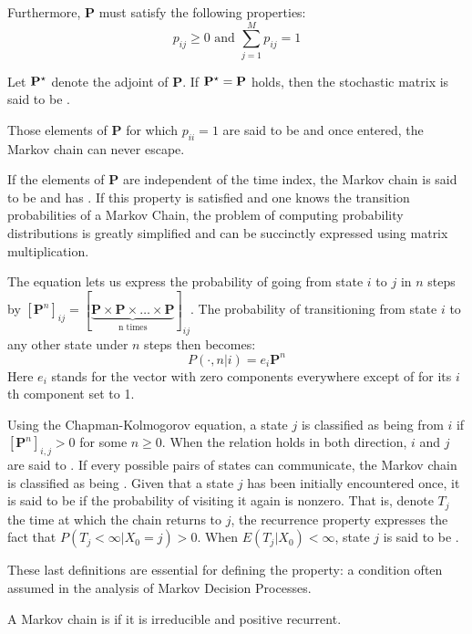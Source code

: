 Furthermore, $\mathbf{P} $ must satisfy the following properties:
\begin{equation}
p_{ij} \geq 0 \mbox{ and } \sum_{j=1}^M p_{ij} =1 
\end{equation}

Let $\mathbf{P}^\star$ denote the adjoint of $\mathbf{P}$. If $\mathbf{P}^\star = \mathbf{P}$ holds, then the stochastic matrix is said to be . 

Those elements of $\mathbf{P}$ for which $p_{ii} = 1$ are said to be
 and once entered, the Markov chain can never escape.

If the elements of $\mathbf{P} $ are independent of the time index, the
Markov chain is said to be  and has . If this property is satisfied and one knows the transition probabilities of
a Markov Chain, the problem of computing probability distributions is greatly
simplified and can be succinctly expressed using matrix multiplication.  

The  equation lets us express the probability of
going from state $i$ to $j$ in $n$ steps by $[\mathbf{P}^n]_{ij} = [
\underbrace{\mathbf{P} \times \mathbf{P} \times \dots \times \mathbf{P}}_{\text{n
times}} ]_{ij}$. The probability of transitioning from state $i$ to any other state under
$n$ steps then becomes:
\begin{equation}
P( \cdot, n | i) = e_i \mathbf{P}^n
\end{equation}
Here $e_i$ stands for the vector with zero components everywhere except of for its
$i$th component set to 1. 

Using the Chapman-Kolmogorov equation, a state $j$ is classified as being
 from $i$ if $[\mathbf{P}^n]_{i,j} > 0$ for some $n \geq 0$. When
the relation holds in both direction, $i$ and $j$ are said to . If
every possible pairs of states can communicate, the Markov chain is classified as being
. Given that a state $j$ has been initially encountered once, it is said to be  if the probability of visiting it again is nonzero. That
is, denote $T_j$ the time at which the chain returns to $j$, the recurrence property
expresses the fact that $P(T_j < \infty | X_0 = j) > 0$. When $E(T_j | X_0) < \infty$,
state $j$ is said to be .

These last definitions are essential for defining the 
property: a condition often assumed in the analysis of Markov Decision Processes.
\begin{defn}
A Markov chain is  if it is irreducible and positive recurrent.
\end{defn}

